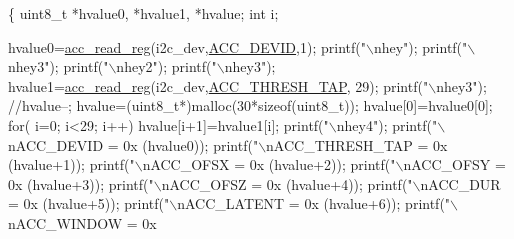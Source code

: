 \begin{DoxyCode}
\{
  uint8\_t *hvalue0, *hvalue1, *hvalue;
  \textcolor{keywordtype}{int} i;
  
  hvalue0=\hyperlink{group__acc_ga2a91c44eebbe44f4d3b8c508633512f9}{acc\_read\_reg}(i2c\_dev,\hyperlink{imu__regs_8h_a007fa8d8ef9d89127ae5da32a2f42283}{ACC\_DEVID},1);
  printf(\textcolor{stringliteral}{"\(\backslash\)nhey"});
  printf(\textcolor{stringliteral}{"\(\backslash\)nhey3"});
  printf(\textcolor{stringliteral}{"\(\backslash\)nhey2"});
  printf(\textcolor{stringliteral}{"\(\backslash\)nhey3"});
  hvalue1=\hyperlink{group__acc_ga2a91c44eebbe44f4d3b8c508633512f9}{acc\_read\_reg}(i2c\_dev,\hyperlink{imu__regs_8h_afa5af181c4af31e22baa9bd20ff322ef}{ACC\_THRESH\_TAP}, 29);
  printf(\textcolor{stringliteral}{"\(\backslash\)nhey3"});
  \textcolor{comment}{//hvalue--;}
  hvalue=(uint8\_t*)malloc(30*\textcolor{keyword}{sizeof}(uint8\_t));
  hvalue[0]=hvalue0[0];
  \textcolor{keywordflow}{for}( i=0; i<29; i++)
    hvalue[i+1]=hvalue1[i];
  printf(\textcolor{stringliteral}{"\(\backslash\)nhey4"});
  printf(\textcolor{stringliteral}{"\(\backslash\)nACC\_DEVID = 0x%
      (hvalue0));
  printf(\textcolor{stringliteral}{"\(\backslash\)nACC\_THRESH\_TAP = 0x%
      (hvalue+1));
  printf(\textcolor{stringliteral}{"\(\backslash\)nACC\_OFSX = 0x%
      (hvalue+2));
  printf(\textcolor{stringliteral}{"\(\backslash\)nACC\_OFSY = 0x%
      (hvalue+3));
  printf(\textcolor{stringliteral}{"\(\backslash\)nACC\_OFSZ = 0x%
      (hvalue+4));
  printf(\textcolor{stringliteral}{"\(\backslash\)nACC\_DUR = 0x%
      (hvalue+5));
  printf(\textcolor{stringliteral}{"\(\backslash\)nACC\_LATENT = 0x%
      (hvalue+6));
  printf(\textcolor{stringliteral}{"\(\backslash\)nACC\_WINDOW = 0x%
}}}}}}}}
\end{DoxyCode}

